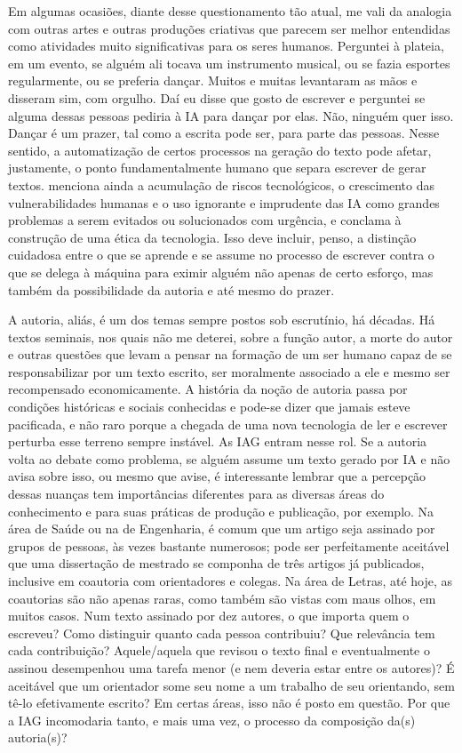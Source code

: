 \documentclass[portuguese]{textolivre}
\begin{document}
Em algumas ocasiões, diante desse questionamento tão atual, me vali da analogia com outras artes e outras produções criativas que parecem ser melhor entendidas como atividades muito significativas para os seres humanos. Perguntei à plateia, em um evento, se alguém ali tocava um instrumento musical, ou se fazia esportes regularmente, ou se preferia dançar. Muitos e muitas levantaram as mãos e disseram sim, com orgulho. Daí eu disse que gosto de escrever e perguntei se alguma dessas pessoas pediria à IA para dançar por elas. Não, ninguém quer isso. Dançar é um prazer, tal como a escrita pode ser, para parte das pessoas. Nesse sentido, a automatização de certos processos na geração do texto pode afetar, justamente, o ponto fundamentalmente humano que separa escrever de gerar textos. \textcite{coeckelbergh2023} menciona ainda a acumulação de riscos tecnológicos, o crescimento das vulnerabilidades humanas e o uso ignorante e imprudente das IA como grandes problemas a serem evitados ou solucionados com urgência, e conclama à construção de uma ética da tecnologia. Isso deve incluir, penso, a distinção cuidadosa entre o que se aprende e se assume no processo de escrever contra o que se delega à máquina para eximir alguém não apenas de certo esforço, mas também da possibilidade da autoria e até mesmo do prazer.

A autoria, aliás, é um dos temas sempre postos sob escrutínio, há décadas. Há textos seminais, nos quais não me deterei, sobre a função autor, a morte do autor e outras questões que levam a pensar na formação de um ser humano capaz de se responsabilizar por um texto escrito, ser moralmente associado a ele e mesmo ser recompensado economicamente. A história da noção de autoria passa por condições históricas e sociais conhecidas e pode-se dizer que jamais esteve pacificada, e não raro porque a chegada de uma nova tecnologia de ler e escrever perturba esse terreno sempre instável. As IAG entram nesse rol. Se a autoria volta ao debate como problema, se alguém assume um texto gerado por IA e não avisa sobre isso, ou mesmo que avise, é interessante lembrar que a percepção dessas nuanças tem importâncias diferentes para as diversas áreas do conhecimento e para suas práticas de produção e publicação, por exemplo. Na área de Saúde ou na de Engenharia, é comum que um artigo seja assinado por grupos de pessoas, às vezes bastante numerosos; pode ser perfeitamente aceitável que uma dissertação de mestrado se componha de três artigos já publicados, inclusive em coautoria com orientadores e colegas. Na área de Letras, até hoje, as coautorias são não apenas raras, como também são vistas com maus olhos, em muitos casos. Num texto assinado por dez autores, o que importa quem o escreveu? Como distinguir quanto cada pessoa contribuiu? Que relevância tem cada contribuição? Aquele/aquela que revisou o texto final e eventualmente o assinou desempenhou uma tarefa menor (e nem deveria estar entre os autores)? É aceitável que um orientador some seu nome a um trabalho de seu orientando, sem tê-lo efetivamente escrito? Em certas áreas, isso não é posto em questão. Por que a IAG incomodaria tanto, e mais uma vez, o processo da composição da(s) autoria(s)?
\end{document}
